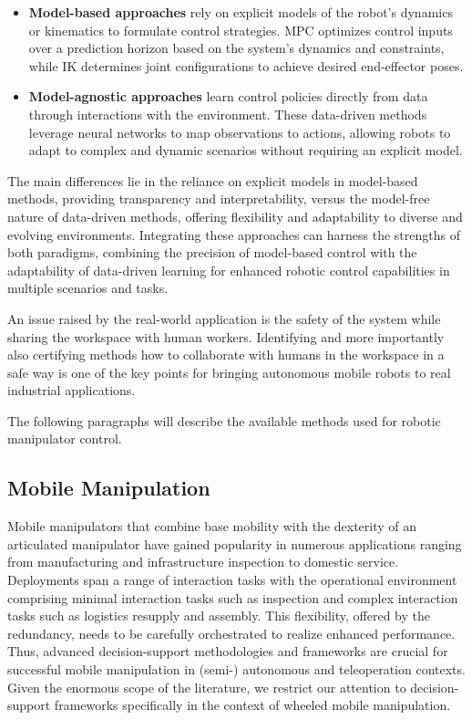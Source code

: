 \begin{itemize}
	\item \textbf{Model-based approaches} rely on explicit models of the robot's dynamics
	      or kinematics to formulate control strategies. MPC optimizes control inputs over a prediction
	      horizon based on the system's dynamics and constraints, while IK determines joint
	      configurations to achieve desired end-effector poses.
	\item \textbf{Model-agnostic approaches} learn control policies directly from data through
	      interactions with the environment. These data-driven methods leverage neural networks
	      to map observations to actions, allowing robots to adapt to complex and dynamic
	      scenarios without requiring an explicit model.
\end{itemize}

The main differences lie in the reliance on explicit models in model-based methods,
providing transparency and interpretability, versus the model-free nature of data-driven methods,
offering flexibility and adaptability to diverse and evolving environments.
Integrating these approaches can harness the strengths of both paradigms, combining the precision of
model-based control with the adaptability of data-driven learning for enhanced
robotic control capabilities in multiple scenarios and tasks.

An issue raised by the real-world application is the safety of the system while sharing
the workspace with human workers. Identifying and more importantly also certifying methods
how to collaborate with humans in the workspace in a safe way is
one of the key points for bringing autonomous mobile robots to real industrial applications.

The following paragraphs will describe the available methods used for robotic manipulator control.

\subsection{Mobile Manipulation}

Mobile manipulators that combine base mobility with the dexterity of an articulated
manipulator have gained popularity in numerous applications ranging from manufacturing
and infrastructure inspection to domestic service. Deployments span a range of interaction
tasks with the operational environment comprising minimal interaction tasks such as
inspection and complex interaction tasks such as logistics resupply and assembly. This flexibility,
offered by the redundancy, needs to be carefully orchestrated to realize enhanced
performance. Thus, advanced decision-support methodologies and frameworks are
crucial for successful mobile manipulation in (semi-) autonomous and teleoperation
contexts. Given the enormous scope of the literature, we restrict our attention to decision-support
frameworks specifically in the context of wheeled mobile manipulation. \cite{thakar2023survey}

